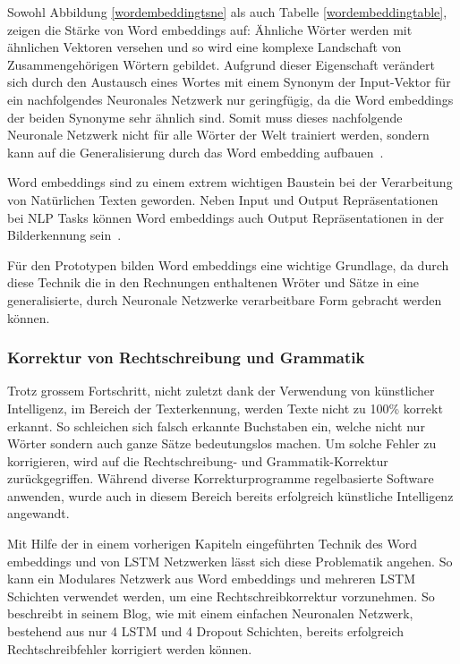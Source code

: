 Sowohl Abbildung \ref{wordembeddingtsne} als auch Tabelle \ref{wordembeddingtable}, zeigen die Stärke von Word embeddings auf: Ähnliche Wörter werden mit ähnlichen Vektoren versehen und so wird eine komplexe Landschaft von Zusammengehörigen Wörtern gebildet. Aufgrund dieser Eigenschaft verändert sich durch den Austausch eines Wortes mit einem Synonym der Input-Vektor für ein nachfolgendes Neuronales Netzwerk nur geringfügig, da die Word embeddings der beiden Synonyme sehr ähnlich sind. Somit muss dieses nachfolgende Neuronale Netzwerk nicht für alle Wörter der Welt trainiert werden, sondern kann auf die Generalisierung durch das Word embedding aufbauen~\autocite{Olah2014b}.

Word embeddings sind zu einem extrem wichtigen Baustein bei der Verarbeitung von Natürlichen Texten geworden. Neben Input und Output Repräsentationen bei NLP Tasks können Word embeddings auch Output Repräsentationen in der Bilderkennung sein~\autocite{Olah2014b}. 

Für den Prototypen bilden Word embeddings eine wichtige Grundlage, da durch diese Technik die in den Rechnungen enthaltenen Wröter und Sätze in eine generalisierte, durch Neuronale Netzwerke verarbeitbare Form gebracht werden können.

\subsubsection{Korrektur von Rechtschreibung und Grammatik}

Trotz grossem Fortschritt, nicht zuletzt dank der Verwendung von künstlicher Intelligenz, im Bereich der Texterkennung, werden Texte nicht zu 100\% korrekt erkannt. So schleichen sich falsch erkannte Buchstaben ein, welche nicht nur Wörter sondern auch ganze Sätze bedeutungslos machen. Um solche Fehler zu korrigieren, wird auf die Rechtschreibung- und Grammatik-Korrektur zurückgegriffen. Während diverse Korrekturprogramme regelbasierte Software anwenden, wurde auch in diesem Bereich bereits erfolgreich künstliche Intelligenz angewandt.

Mit Hilfe der in einem vorherigen Kapiteln eingeführten Technik des Word embeddings und von LSTM Netzwerken lässt sich diese Problematik angehen. So kann ein Modulares Netzwerk aus Word embeddings und mehreren LSTM Schichten verwendet werden, um eine Rechtschreibkorrektur vorzunehmen. So beschreibt \textcite{Weiss2016} in seinem Blog, wie mit einem einfachen Neuronalen Netzwerk, bestehend aus nur 4 LSTM und 4 Dropout Schichten, bereits erfolgreich Rechtschreibfehler korrigiert werden können. 

